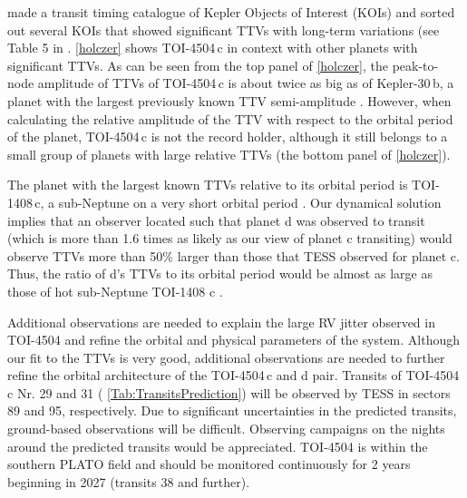 \documentclass[twocolumn,twocolappendix]{aastex631}
\let\orgautoref\autoref
\renewcommand{\autoref}
        {\def\equationautorefname{Eq.}%
         \def\figureautorefname{Fig.}%
         \def\sectionautorefname{Sect.}%
         \def\subsectionautorefname{Sect.}%
         \def\subsubsectionautorefname{Sect.}%
         \orgautoref}
\begin{document}
\cite{Holczer2016} made a transit timing catalogue of Kepler Objects of Interest (KOIs) and sorted out several KOIs that showed significant TTVs with long-term variations (see Table 5 in \cite{Holczer2016}. \autoref{holczer} shows TOI-4504\,c in context with other planets with significant TTVs. As can be seen from the top panel of \autoref{holczer}, the peak-to-node amplitude of TTVs of TOI-4504\,c is about twice as big as of Kepler-30\,b, a planet with the largest previously known TTV semi-amplitude \citep{Kepler30b}. However, when calculating the relative amplitude of the TTV with respect to the orbital period of the planet, TOI-4504\,c is not the record holder, although it still belongs to a small group of planets with large relative TTVs (the bottom panel of \autoref{holczer}).

The planet with the largest known TTVs relative to its orbital period is TOI-1408\,c, a sub-Neptune on a very short orbital period \citep{toi-1408}. Our dynamical solution implies that an observer located such that planet d was observed to transit (which is more than 1.6 times as likely as our view of planet c transiting) would observe TTVs more than 50\% larger than those that TESS observed for planet c. Thus, the ratio of d's TTVs to its orbital period would be almost as large as those of hot sub-Neptune TOI-1408 c \citep{toi-1408}.



Additional observations are needed to explain the large RV jitter observed in TOI-4504 and refine the orbital and physical parameters of the system. 
Although our fit to the TTVs is very good, additional observations are needed to further refine the orbital architecture of the TOI-4504\,c and d pair. Transits of TOI-4504\,c Nr. 29 and 31 (\autoref{Tab:TransitsPrediction}) will be observed by TESS in sectors 89 and 95, respectively. Due to significant uncertainties in the predicted transits, ground-based observations will be difficult. Observing campaigns on the nights around the predicted transits would be appreciated. TOI-4504 is within the southern PLATO field and should be monitored continuously for 2 years beginning in 2027 (transits 38 and further).
\end{document}
